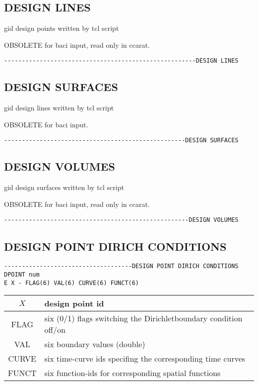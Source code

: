 \subsection{DESIGN LINES}
gid design points written by tcl script

OBSOLETE for baci input, read only in ccarat.

\begin{verbatim}
------------------------------------------------------DESIGN LINES
\end{verbatim}



\subsection{DESIGN SURFACES}
gid design lines written by tcl script

OBSOLETE for baci input.

\begin{verbatim}
---------------------------------------------------DESIGN SURFACES
\end{verbatim}



\subsection{DESIGN VOLUMES}
gid design surfaces written by tcl script

OBSOLETE for baci input, read only in ccarat.

\begin{verbatim}
----------------------------------------------------DESIGN VOLUMES
\end{verbatim}



\subsection{DESIGN POINT DIRICH CONDITIONS}
\begin{verbatim}
------------------------------------DESIGN POINT DIRICH CONDITIONS 
DPOINT num
E X - FLAG(6) VAL(6) CURVE(6) FUNCT(6)
\end{verbatim}
\begin{center}
\begin{tabular}{c||l}
$X$                           & design point id                                                  \\ \hline
FLAG                          & six (0/1) flags switching the Dirichletboundary condition off/on \\ \hline
VAL                           & six boundary values (double)                                     \\ \hline
CURVE                         & six time-curve ids specifing the corresponding time curves       \\ \hline
FUNCT                         & six function-ids for corresponding spatial functions             \\ 
\end{tabular}
\end{center}


